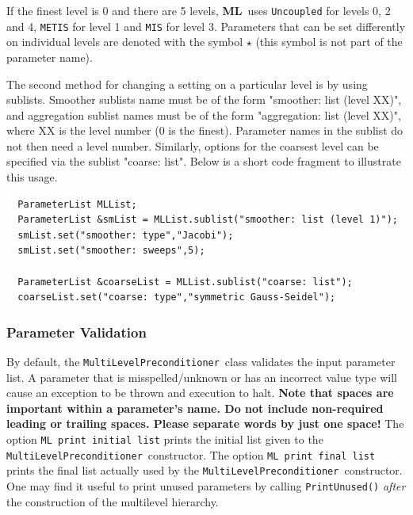 \documentclass{article}[11pt]
\newcommand{\ML}     {{\bf ML}}
\newcommand \mlp {{\tt MultiLevelPreconditioner}}
\def\choicebox#1#2{\noindent$\hphantom{th}$\parbox[t]{3.0in}{\sf
#1}\parbox[t]{3.35in}{#2}\\[0.8em]}
\begin{document}
\noindent
If the finest level is 0 and there are 5 levels, 
\ML\ uses {\tt Uncoupled} for levels 0, 2 and 4, 
{\tt METIS} for level 1 and {\tt MIS} for level 3.
Parameters that can be set differently on individual levels are denoted
with the symbol $\star$ (this symbol is not part of the parameter name).

The second method for changing a setting on a particular level
is by using sublists.
Smoother sublists name must be of the form "smoother: list (level XX)",
and aggregation sublist names must be of the form "aggregation: list (level
XX)", where XX is the
level number (0 is the finest).  Parameter names in the sublist do not then
need a level number.  Similarly, options for the coarsest level can be
specified via the sublist "coarse: list".  Below is a short code fragment to
illustrate this usage.
%
\begin{verbatim}
  ParameterList MLList;
  ParameterList &smList = MLList.sublist("smoother: list (level 1)");
  smList.set("smoother: type","Jacobi");
  smList.set("smoother: sweeps",5);

  ParameterList &coarseList = MLList.sublist("coarse: list");
  coarseList.set("coarse: type","symmetric Gauss-Seidel");
\end{verbatim}

\subsubsection{Parameter Validation}
\label{sec:parameter validation}
%
By default, the \mlp~class validates the input parameter list.  A 
parameter that is misspelled/unknown or has an incorrect value type will cause an exception to be thrown and execution to halt.
{\bf Note that spaces are important within a parameter's name.  Do not
  include non-required leading or trailing spaces. Please separate words by
  just one space!}
  The option \verb!ML print initial list! prints the initial list given to the
  \mlp~constructor.  The option \verb!ML print final list! prints
  the final list actually used by the \mlp~constructor.
  One may
  find it useful to print unused parameters by calling \verb!PrintUnused()!
  {\sl after} the construction of the multilevel hierarchy.\\

\end{document}
